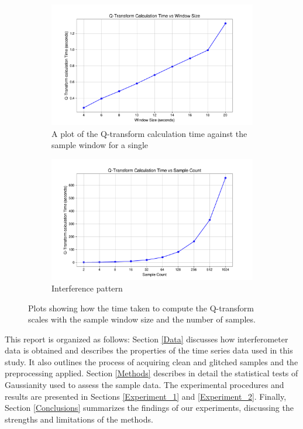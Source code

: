 \documentclass[12pt]{article}
\begin{document}
\begin{figure}[H]
  \centering
  \begin{subfigure}[t]{0.65\textwidth}
    \centering
    \includegraphics[width=\textwidth]{images/q_transform_time_vs_window_size.pdf}
    \caption{A plot of the Q-transform calculation time against the sample window for a single  }
    \label{fig:qtransform_vs_windowsize}
  \end{subfigure}
  \hspace{25px}
  \begin{subfigure}[t]{0.65\textwidth}
    \centering
    \includegraphics[width=\textwidth]{images/q_transform_time_vs_sample_count.pdf}
    \caption{Interference pattern}
    \label{fig:qtransform_vs_samplecount}
  \end{subfigure}
  \caption{Plots showing how the time taken to compute the Q-transform scales with the sample window size and the number of samples.}
\end{figure}

\noindent This report is organized as follows: Section \ref{Data} discusses how interferometer data is obtained and describes the properties of the time series data used in this study. It also outlines the process of acquiring clean and glitched samples and the preprocessing applied. Section \ref{Methods} describes in detail the statistical tests of Gaussianity used to assess the sample data. The experimental procedures and results are presented in Sections \ref{Experiment_1} and \ref{Experiment_2}. Finally, Section \ref{Conclusions} summarizes the findings of our experiments, discussing the strengths and limitations of the methods.
\end{document}

